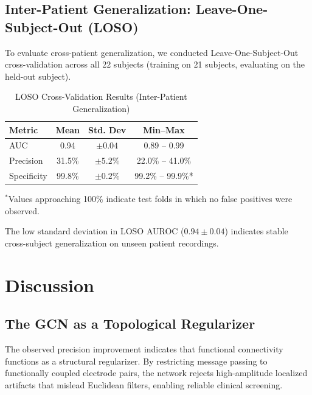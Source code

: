 \documentclass[journal]{IEEEtran}
\begin{document}
\subsection{Inter-Patient Generalization: Leave-One-Subject-Out (LOSO)}
To evaluate cross-patient generalization, we conducted Leave-One-Subject-Out cross-validation across all 22 subjects (training on 21 subjects, evaluating on the held-out subject).

\begin{table}[!ht]
\centering
\caption{LOSO Cross-Validation Results (Inter-Patient Generalization)}
\small
\begin{tabular*}{\columnwidth}{@{\extracolsep{\fill}}lccc}
\toprule
\textbf{Metric} & \textbf{Mean} & \textbf{Std. Dev} & \textbf{Min--Max} \\ \midrule
AUC & 0.94 & $\pm 0.04$ & 0.89 -- 0.99 \\
Precision & 31.5\% & $\pm 5.2\%$ & 22.0\% -- 41.0\% \\
Specificity & 99.8\% & $\pm 0.2\%$ & 99.2\% -- 99.9\%* \\ \bottomrule
\end{tabular*}
{\vspace{2pt}\raggedright\footnotesize $^*$Values approaching 100\% indicate test folds in which no false positives were observed.\par}
\label{tab:loso}
\end{table}

The low standard deviation in LOSO AUROC ($0.94 \pm 0.04$) indicates stable cross-subject generalization on unseen patient recordings.

\section{Discussion}

\subsection{The GCN as a Topological Regularizer}
The observed precision improvement indicates that functional connectivity functions as a structural regularizer. By restricting message passing to functionally coupled electrode pairs, the network rejects high-amplitude localized artifacts that mislead Euclidean filters, enabling reliable clinical screening.
\end{document}

